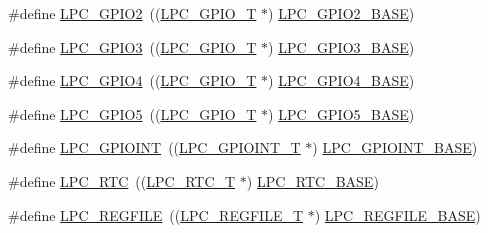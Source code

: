 \begin{DoxyCompactItemize}
\item 
\#define \hyperlink{group__PERIPH__407X__8X__BASE_ga27a09e8c08f9e209c6af70b0a3c56b39}{L\-P\-C\-\_\-\-G\-P\-I\-O2}~((\hyperlink{structLPC__GPIO__T}{L\-P\-C\-\_\-\-G\-P\-I\-O\-\_\-\-T}             $\ast$) \hyperlink{group__PERIPH__407X__8X__BASE_gae5524b2d728167194033ec7a1841a36b}{L\-P\-C\-\_\-\-G\-P\-I\-O2\-\_\-\-B\-A\-S\-E})
\item 
\#define \hyperlink{group__PERIPH__407X__8X__BASE_ga6e961eb01d0f1e61dd9b9d5979d2aafc}{L\-P\-C\-\_\-\-G\-P\-I\-O3}~((\hyperlink{structLPC__GPIO__T}{L\-P\-C\-\_\-\-G\-P\-I\-O\-\_\-\-T}             $\ast$) \hyperlink{group__PERIPH__407X__8X__BASE_ga56c68c5326b521b3278a35f4d81369a9}{L\-P\-C\-\_\-\-G\-P\-I\-O3\-\_\-\-B\-A\-S\-E})
\item 
\#define \hyperlink{group__PERIPH__407X__8X__BASE_ga652a560a972d4edec8a67cd85ad4bd60}{L\-P\-C\-\_\-\-G\-P\-I\-O4}~((\hyperlink{structLPC__GPIO__T}{L\-P\-C\-\_\-\-G\-P\-I\-O\-\_\-\-T}             $\ast$) \hyperlink{group__PERIPH__407X__8X__BASE_gaa54352e7745932e78b56bcbc1d70fa21}{L\-P\-C\-\_\-\-G\-P\-I\-O4\-\_\-\-B\-A\-S\-E})
\item 
\#define \hyperlink{group__PERIPH__407X__8X__BASE_gad41551ad62a13c91b7fff17e4340cb69}{L\-P\-C\-\_\-\-G\-P\-I\-O5}~((\hyperlink{structLPC__GPIO__T}{L\-P\-C\-\_\-\-G\-P\-I\-O\-\_\-\-T}             $\ast$) \hyperlink{group__PERIPH__407X__8X__BASE_gaf6bbc732156be98ff8a4d15fa7558ad6}{L\-P\-C\-\_\-\-G\-P\-I\-O5\-\_\-\-B\-A\-S\-E})
\item 
\#define \hyperlink{group__PERIPH__407X__8X__BASE_gaefe2f52407c1ce58395766dc760525b5}{L\-P\-C\-\_\-\-G\-P\-I\-O\-I\-N\-T}~((\hyperlink{structLPC__GPIOINT__T}{L\-P\-C\-\_\-\-G\-P\-I\-O\-I\-N\-T\-\_\-\-T}          $\ast$) \hyperlink{group__PERIPH__407X__8X__BASE_gadf88491f4b83b5af99eaf30778cb62fa}{L\-P\-C\-\_\-\-G\-P\-I\-O\-I\-N\-T\-\_\-\-B\-A\-S\-E})
\item 
\#define \hyperlink{group__PERIPH__407X__8X__BASE_ga8303d3e5135b2a039f0dc5f93c194f78}{L\-P\-C\-\_\-\-R\-T\-C}~((\hyperlink{structLPC__RTC__T}{L\-P\-C\-\_\-\-R\-T\-C\-\_\-\-T}              $\ast$) \hyperlink{group__PERIPH__407X__8X__BASE_ga4618213cf968f8245814d7d3e7aa2e2e}{L\-P\-C\-\_\-\-R\-T\-C\-\_\-\-B\-A\-S\-E})
\item 
\#define \hyperlink{group__PERIPH__407X__8X__BASE_ga2c74da31b7fd461d9b01e3241963f895}{L\-P\-C\-\_\-\-R\-E\-G\-F\-I\-L\-E}~((\hyperlink{structLPC__REGFILE__T}{L\-P\-C\-\_\-\-R\-E\-G\-F\-I\-L\-E\-\_\-\-T}          $\ast$) \hyperlink{group__PERIPH__407X__8X__BASE_gad2674eff10cea9243ab060ad1fbac9d2}{L\-P\-C\-\_\-\-R\-E\-G\-F\-I\-L\-E\-\_\-\-B\-A\-S\-E})

\end{DoxyCompactItemize}
